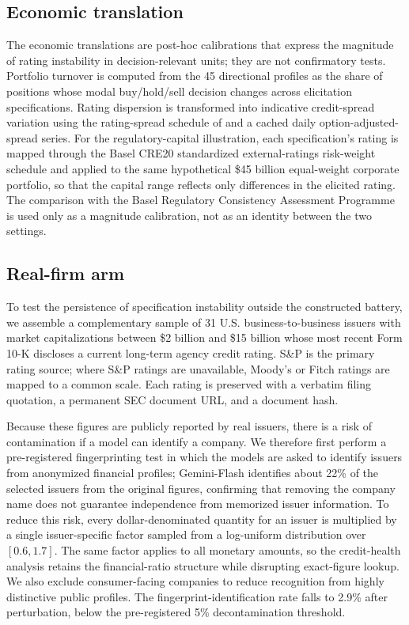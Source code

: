 \documentclass[a4paper,fleqn]{cas-sc}
\begin{document}
\subsection{Economic translation}
The economic translations are post-hoc calibrations that express the magnitude of rating instability in
decision-relevant units; they are not confirmatory tests. Portfolio turnover is computed from the 45
directional profiles as the share of positions whose modal buy/hold/sell decision changes across
elicitation specifications. Rating dispersion is transformed into indicative credit-spread variation
using the rating-spread schedule of \citet{cornaggia2018} and a cached daily option-adjusted-spread
series. For the regulatory-capital illustration, each specification's rating is mapped through the Basel
CRE20 standardized external-ratings risk-weight schedule \citep{bcbs2019cre20} and applied to the same
hypothetical \$45 billion equal-weight corporate portfolio, so that the capital range reflects only
differences in the elicited rating. The comparison with the Basel Regulatory Consistency Assessment
Programme \citep{bcbs2013rcap} is used only as a magnitude calibration, not as an identity between the two
settings.

\subsection{Real-firm arm}
To test the persistence of specification instability outside the constructed battery, we assemble a
complementary sample of 31 U.S. business-to-business issuers with market capitalizations between \$2
billion and \$15 billion whose most recent Form 10-K discloses a current long-term agency credit rating.
S\&P is the primary rating source; where S\&P ratings are unavailable, Moody's or Fitch ratings are
mapped to a common scale. Each rating is preserved with a verbatim filing quotation, a permanent SEC
document URL, and a document hash.

Because these figures are publicly reported by real issuers, there is a risk of contamination if a model
can identify a company. We therefore first perform a pre-registered fingerprinting test in which the
models are asked to identify issuers from anonymized financial profiles; Gemini-Flash identifies about
22\% of the selected issuers from the original figures, confirming that removing the company name does not
guarantee independence from memorized issuer information. To reduce this risk, every dollar-denominated
quantity for an issuer is multiplied by a single issuer-specific factor sampled from a log-uniform
distribution over $[0.6,1.7]$. The same factor applies to all monetary amounts, so the credit-health
analysis retains the financial-ratio structure while disrupting exact-figure lookup. We also
exclude consumer-facing companies to reduce recognition from highly distinctive public profiles. The
fingerprint-identification rate falls to 2.9\% after perturbation, below the pre-registered 5\%
decontamination threshold.
\end{document}
